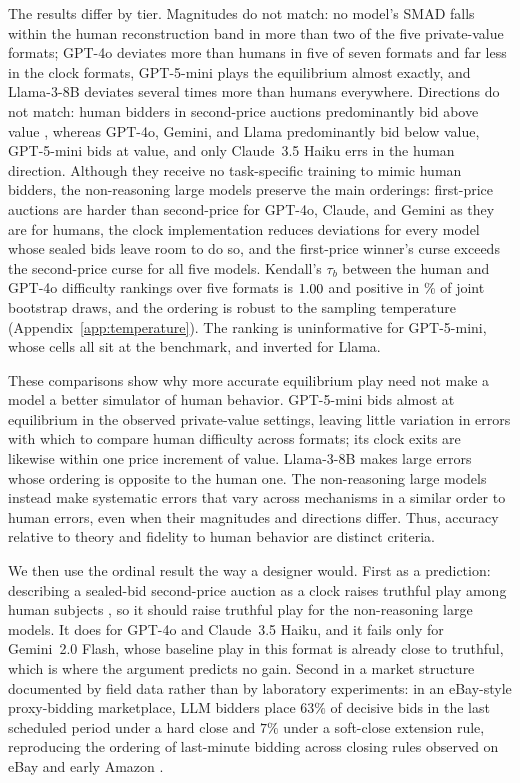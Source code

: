 \documentclass[acmsmall,screen,review]{acmart}
\newcommand{\rev}[1]{{\color{blue}#1}}
\newcommand{\rev}[1]{#1}
\begin{document}
The results differ by tier.
Magnitudes do not match: no model's SMAD falls within the human reconstruction band in more than two of the five private-value formats; GPT-4o deviates more than humans in five of seven formats and far less in the clock formats, GPT-5-mini plays the equilibrium almost exactly, and Llama-3-8B deviates several times more than humans everywhere.
Directions do not match: human bidders in second-price auctions predominantly bid above value \citep{kagel1993independent, li2017obviously}, whereas GPT-4o, Gemini, and Llama predominantly bid below value, GPT-5-mini bids at value, and only Claude~3.5 Haiku errs in the human direction.
Although they receive no task-specific training to mimic human bidders, the non-reasoning large models preserve the main orderings: first-price auctions are harder than second-price for GPT-4o, Claude, and Gemini as they are for humans, the clock implementation reduces deviations \rev{for every model whose sealed bids leave room to do so}, and the first-price winner's curse exceeds the second-price curse for all five models.
Kendall's $\tau_b$ between the human and GPT-4o difficulty rankings over five formats is \rev{$1.00$ and positive in \TauFivePGpt\% of joint bootstrap draws}, and the ordering is robust to the sampling temperature (Appendix~\ref{app:temperature}).
The ranking is uninformative for GPT-5-mini, whose cells all sit at the benchmark, and inverted for Llama.

These comparisons show why more accurate equilibrium play need not make a model a better simulator of human behavior.
GPT-5-mini bids almost at equilibrium in the observed private-value settings, leaving little variation in errors with which to compare human difficulty across formats\rev{; its clock exits are likewise within one price increment of value}.
Llama-3-8B makes large errors whose ordering is opposite to the human one.
The non-reasoning large models instead make systematic errors that vary across mechanisms in a similar order to human errors, even when their magnitudes and directions differ.
Thus, accuracy relative to theory and fidelity to human behavior are distinct criteria.

We then use the ordinal result the way a designer would.
First as a prediction: describing a sealed-bid second-price auction as a clock raises truthful play among human subjects \citep{breitmoser2022obviousness}, so it should raise truthful play for the non-reasoning large models.
It does for GPT-4o and Claude~3.5 Haiku, and it fails only for Gemini~2.0 Flash, whose baseline play in this format is already close to truthful, which is where the argument predicts no gain.
Second in a market structure documented by field data rather than by laboratory experiments: in an eBay-style proxy-bidding marketplace, LLM bidders place $63\%$ of decisive bids in the last scheduled period under a hard close and $7\%$ under a soft-close extension rule, reproducing the ordering of last-minute bidding across closing rules observed on eBay and early Amazon \citep{roth2002last, ockenfels2006late}.
\end{document}
